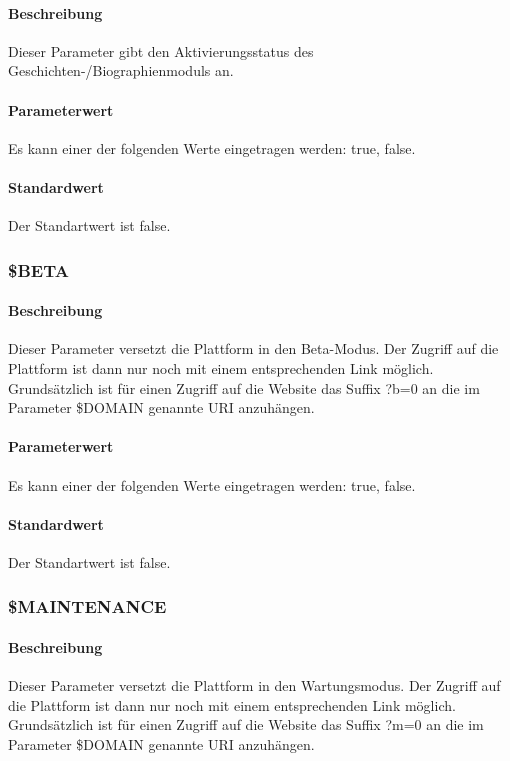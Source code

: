 \paragraph{Beschreibung}Dieser Parameter gibt den Aktivierungsstatus des Geschichten-/Biographienmoduls an.
\paragraph{Parameterwert}Es kann einer der folgenden Werte eingetragen werden: {\glqq true\grqq}, {\glqq false\grqq}.
\paragraph{Standardwert}Der Standartwert ist {\glqq false\grqq}.

\subsubsection{\$BETA}
\paragraph{Beschreibung}Dieser Parameter versetzt die Plattform in den Beta-Modus. Der Zugriff auf die Plattform ist dann nur noch mit einem entsprechenden Link möglich. Grundsätzlich ist für einen Zugriff auf die Website das Suffix {\glqq ?b=0\grqq} an die im Parameter {\glqq \$DOMAIN\grqq} genannte URI anzuhängen.
\paragraph{Parameterwert}Es kann einer der folgenden Werte eingetragen werden: {\glqq true\grqq}, {\glqq false\grqq}.
\paragraph{Standardwert}Der Standartwert ist {\glqq false\grqq}.

\subsubsection{\$MAINTENANCE}
\paragraph{Beschreibung}Dieser Parameter versetzt die Plattform in den Wartungsmodus. Der Zugriff auf die Plattform ist dann nur noch mit einem entsprechenden Link möglich. Grundsätzlich ist für einen Zugriff auf die Website das Suffix {\glqq ?m=0\grqq} an die im Parameter {\glqq \$DOMAIN\grqq} genannte URI anzuhängen.
